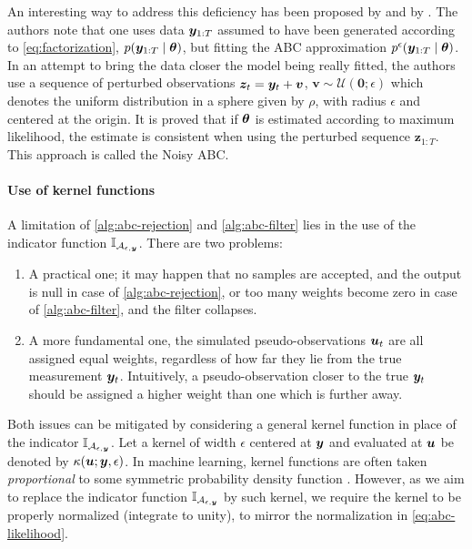 An interesting way to address this deficiency has been proposed by \cite{noisy-abc1} and by \cite{noisy-abc2}. The authors note that one uses data $\bm{y}_{1:T}$ assumed to have been generated according to \eqref{eq:factorization}, $p(\bm{y}_{1:T} \mid \bm{\theta})$, but fitting the ABC approximation $p^\epsilon(\bm{y}_{1:T} \mid \bm{\theta})$. In an attempt to bring the data closer the model being really fitted, the authors use a sequence of perturbed observations $\bm{z}_t = \bm{y}_t + \bm{v}$, $\bm{v} \sim \mathcal{U}(\bm{0}; \epsilon)$ which denotes the uniform distribution in a sphere given by $\rho$, with radius $\epsilon$ and centered at the origin. It is proved that if $\bm{\theta}$ is estimated according to maximum likelihood, the estimate is consistent when using the perturbed sequence $\bm{z}_{1:T}$. This approach is called the Noisy ABC.


\paragraph{Use of kernel functions}
A limitation of \autoref{alg:abc-rejection} and \autoref{alg:abc-filter} lies in the use of the indicator function $\mathbb{I}_{\mathcal{A}_{\epsilon, \bm{y}}}$. There are two problems:
\begin{enumerate}
    \item A practical one; it may happen that no samples are accepted, and the output is null in case of \autoref{alg:abc-rejection}, or too many weights become zero in case of \autoref{alg:abc-filter}, and the filter collapses.
    \item A more fundamental one, the simulated pseudo-observations $\bm{u}_t$ are all assigned equal weights, regardless of how far they lie from the true measurement $\bm{y}_t$. Intuitively, a pseudo-observation closer to the true $\bm{y}_t$ should be assigned a higher weight than one which is further away.
\end{enumerate}
Both issues can be mitigated by considering a general kernel function in place of the indicator $\mathbb{I}_{\mathcal{A}_{\epsilon, \bm{y}}}$. Let a kernel of width $\epsilon$ centered at $\bm{y}$ and evaluated at $\bm{u}$ be denoted by $\kappa(\bm{u}; \bm{y}, \epsilon)$. In machine learning, kernel functions are often taken \emph{proportional} to some symmetric probability density function \citep{elements}. However, as we aim to replace the indicator function $\mathbb{I}_{\mathcal{A}_{\epsilon, \bm{y}}}$ by such kernel, we require the kernel to be properly normalized (integrate to unity), to mirror the normalization in \eqref{eq:abc-likelihood}.

